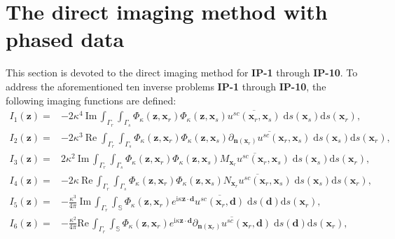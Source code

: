 \documentclass[10pt,a4paper]{article}
\numberwithin{equation}{section}
\begin{document}
\section{The direct imaging method with phased data}
\label{sec:phased}
This section is devoted to the direct imaging method for \textbf{IP-1} through \textbf{IP-10}. 
To address the aforementioned ten inverse problems \textbf{IP-1} through \textbf{IP-10}, the following imaging functions are defined:
\begin{align}
  \label{fun-1}
  I_1(\bm{ z }) =& -2 \kappa^4 ~\mathrm{Im}\, \int_{ \Gamma_{r} } \int_{ \Gamma_{s} } \Phi_{\kappa}(\bm{ z },\bm{ x }_r)  \Phi_{\kappa}(\bm{ z },\bm{ x }_s)
                   \overline{u^{sc}(\bm{ x }_r,\bm{ x }_s)} \;\mathrm{d}s(\bm{ x }_s)\mathrm{d}s(\bm{ x }_r), \\
   \label{fun-2}
  I_2(\bm{ z }) =&- 2 \kappa^3 ~\mathrm{Re}\; \int_{ \Gamma_{r} } \int_{ \Gamma_{s} } \Phi_{\kappa}(\bm{ z },\bm{ x }_r)  \Phi_{\kappa}(\bm{ z },\bm{ x }_s)
                   \overline{\partial_{\bm{n}(\bm{ x }_{r}) } u^{sc}(\bm{ x }_r,\bm{ x }_s)}
                   \;\mathrm{d}s(\bm{ x }_s)\mathrm{d}s(\bm{ x }_r), \\
   \label{fun-3}
   I_3(\bm{ z }) =& 2 \kappa^2 ~\mathrm{Im}\, \int_{ \Gamma_{r} } \int_{ \Gamma_{s} } \Phi_{\kappa}(\bm{ z },\bm{ x }_r)  \Phi_{\kappa}(\bm{ z },\bm{ x }_s)
                   \overline{M_{\bm{ x }_{r} } u^{sc}(\bm{ x }_r,\bm{ x }_s)}
                    \;\mathrm{d}s(\bm{ x }_s)\mathrm{d}s(\bm{ x }_r), \\
   \label{fun-4}
   I_4(\bm{ z }) =& -2 \kappa ~\mathrm{Re}\, \int_{ \Gamma_{r} } \int_{ \Gamma_{s} } \Phi_{\kappa}(\bm{ z },\bm{ x }_r)  \Phi_{\kappa}(\bm{ z },\bm{ x }_s)
                   \overline{N_{\bm{ x }_{r} } u^{sc}(\bm{ x }_r,\bm{ x }_s)}
                    \;\mathrm{d}s(\bm{ x }_s)\mathrm{d}s(\bm{ x }_r), \\
   \label{fun-5}
  I_5(\bm{ z }) =& -\frac{ \kappa^3}{4\pi} ~\mathrm{Im}\, \int_{ \Gamma_{r} } \int_{\mathbb{S}  } \Phi_{\kappa}(\bm{ z },\bm{ x }_r) e^{\mathrm{ i } \kappa \bm{ z }\cdot \bm{ d }}
                   \overline{u^{sc}(\bm{ x }_r,\bm{ d })} \;\mathrm{d}s(\bm{ d })\mathrm{d}s(\bm{ x }_r), \\
   \label{fun-6}
  I_6(\bm{ z }) =&  -\frac{ \kappa^2}{4\pi}\mathrm{Re}\, \int_{ \Gamma_{r} } \int_{\mathbb{S}  } \Phi_{\kappa}(\bm{ z },\bm{ x }_r) e^{\mathrm{ i } \kappa \bm{ z }\cdot \bm{ d }}
                   \overline{\partial_{\bm{n}(\bm{ x }_{r}) }u^{sc}(\bm{ x }_r,\bm{ d })}
                   \;\mathrm{d}s(\bm{ d })\mathrm{d}s(\bm{ x }_r), \\

\end{align}
\end{document}
